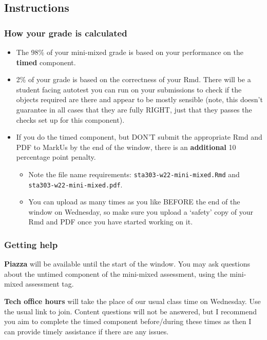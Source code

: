 \documentclass[
  openany]{book}
\providecommand{\tightlist}{%
  \setlength{\itemsep}{0pt}\setlength{\parskip}{0pt}}
\begin{document}
\hypertarget{instructions-1}{%
\subsection{Instructions}\label{instructions-1}}

\hypertarget{how-your-grade-is-calculated}{%
\subsubsection{How your grade is calculated}\label{how-your-grade-is-calculated}}

\begin{itemize}
\item
  The 98\% of your mini-mixed grade is based on your performance on the \textbf{timed} component.
\item
  2\% of your grade is based on the correctness of your Rmd. There will be a student facing autotest you can run on your submissions to check if the objects required are there and appear to be mostly sensible (note, this doesn't guarantee in all cases that they are fully RIGHT, just that they passes the checks set up for this component).
\item
  If you do the timed component, but DON'T submit the appropriate Rmd and PDF to MarkUs by the end of the window, there is an \textbf{additional} 10 percentage point penalty.

  \begin{itemize}
  \tightlist
  \item
    Note the file name requirements: \texttt{sta303-w22-mini-mixed.Rmd} and \texttt{sta303-w22-mini-mixed.pdf}.
  \item
    You can upload as many times as you like BEFORE the end of the window on Wednesday, so make sure you upload a `safety' copy of your Rmd and PDF once you have started working on it.
  \end{itemize}
\end{itemize}

\hypertarget{getting-help}{%
\subsubsection{Getting help}\label{getting-help}}

\textbf{Piazza} will be available until the start of the window. You may ask questions about the untimed component of the mini-mixed assessment, using the mini-mixed assessment tag.

\textbf{Tech office hours} will take the place of our usual class time on Wednesday. Use the usual link to join. Content questions will not be answered, but I recommend you aim to complete the timed component before/during these times as then I can provide timely assistance if there are any issues.
\end{document}
